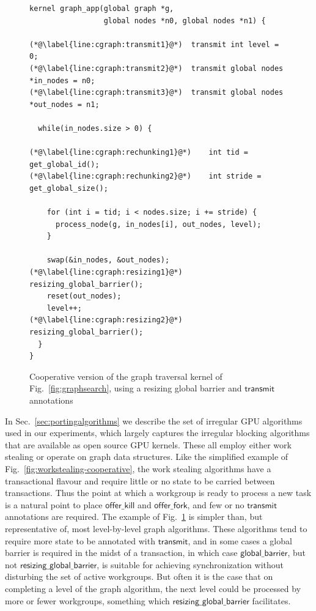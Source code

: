\documentclass[numbers,nocopyrightspace,10pt]{sigplanconf}
\newcommand{\myfig}{Fig.~}
\newcommand{\mysec}{Sec.~}
\newcommand{\transmit}{\mathsf{transmit}}
\newcommand{\offerfork}{\mathsf{offer\_fork}}
\newcommand{\offerkill}{\mathsf{offer\_kill}}
\newcommand{\globalbarrier}{\mathsf{global\_barrier}}
\newcommand{\resizingglobalbarrier}{\mathsf{resizing\_global\_barrier}}
\begin{document}
\begin{figure}

\begin{lstlisting}
kernel graph_app(global graph *g, 
                 global nodes *n0, global nodes *n1) {

(*@\label{line:cgraph:transmit1}@*)  transmit int level = 0;
(*@\label{line:cgraph:transmit2}@*)  transmit global nodes *in_nodes = n0;
(*@\label{line:cgraph:transmit3}@*)  transmit global nodes *out_nodes = n1;

  while(in_nodes.size > 0) {

(*@\label{line:cgraph:rechunking1}@*)    int tid = get_global_id();
(*@\label{line:cgraph:rechunking2}@*)    int stride = get_global_size();

    for (int i = tid; i < nodes.size; i += stride) {
      process_node(g, in_nodes[i], out_nodes, level);
    }

    swap(&in_nodes, &out_nodes);
(*@\label{line:cgraph:resizing1}@*)    resizing_global_barrier();
    reset(out_nodes);
    level++;
(*@\label{line:cgraph:resizing2}@*)    resizing_global_barrier();
  }
}
\end{lstlisting}
\caption{Cooperative version of the graph traversal kernel of \myfig\ref{fig:graphsearch}, using a resizing global barrier and $\transmit$ annotations}\label{fig:cgraphsearch}
\end{figure}

In \mysec\ref{sec:portingalgorithms} we describe the set of irregular GPU algorithms used
in our experiments, which largely captures the irregular blocking
algorithms that are available as open source GPU kernels.  These all
employ either work stealing or operate on graph data structures.
Like the simplified example of \myfig\ref{fig:workstealing-cooperative}, the work stealing algorithms have a transactional flavour
and require little or no state to be carried between transactions.  Thus the point at which a workgroup is ready to process a new task is a natural point to place $\offerkill$ and $\offerfork$, and few or no $\transmit$ annotations are required.
%
The example of \myfig\ref{fig:cgraphsearch} is simpler than, but representative of,
most level-by-level graph algorithms.  These algorithms tend to
require more state to be annotated with $\transmit$, and in some cases
a global barrier is required in the midst of a transaction, in which
case $\globalbarrier$, but not $\resizingglobalbarrier$, is suitable
for achieving synchronization without disturbing the set of active
workgroups.  But often it is the case that on completing a level of
the graph algorithm, the next level could be processed by more or
fewer workgroups, something which $\resizingglobalbarrier$
facilitates.
\end{document}
